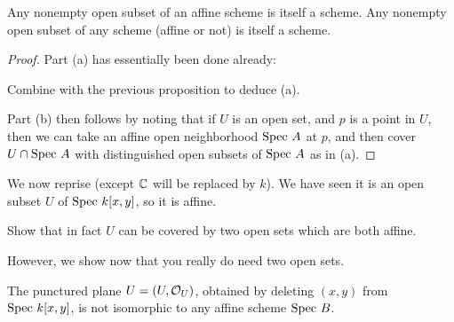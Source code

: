 \begin{corollary}
	\listhack
	\begin{enumerate}[(a)]
		\ii Any nonempty open subset of an affine scheme is itself a scheme.
		\ii Any nonempty open subset of any scheme (affine or not) is itself a scheme.
	\end{enumerate}
\end{corollary}
\begin{proof}
	Part (a) has essentially been done already:
	\begin{ques}
		Combine 
		with the previous proposition to deduce (a).
	\end{ques}
	Part (b) then follows by noting that if $U$ is an open set,
	and $p$ is a point in $U$,
	then we can take an affine open neighborhood $\text{Spec } A$ at $p$,
	and then cover $U \cap \text{Spec } A$ with distinguished
	open subsets of $\text{Spec } A$ as in (a).
\end{proof}

We now reprise 
(except $\mathbb C$ will be replaced by $k$).
We have seen it is an open subset $U$ of $\text{Spec } k[x,y]$, so it is affine.
\begin{ques}
	Show that in fact $U$ can be covered by
	two open sets which are both affine.
\end{ques}
However, we show now that you really do need two open sets.
\begin{proposition}
	The punctured plane $U = (U, \mathcal O_U)$,
	obtained by deleting $(x,y)$ from $\text{Spec } k[x,y]$,
	is not isomorphic to any affine scheme $\text{Spec } B$.
\end{proposition}

